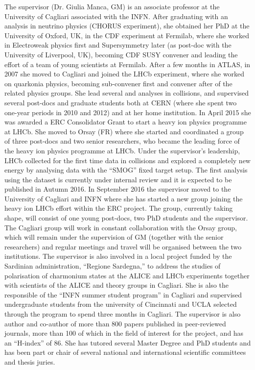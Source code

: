 \documentclass[a4paper,11pt]{article}
\begin{document}
The supervisor (Dr. Giulia Manca, GM) is an associate professor at the 
University of Cagliari associated with the INFN. After graduating with an 
analysis in neutrino physics (CHORUS experiment), she obtained her 
PhD at the University of Oxford, UK, in the CDF experiment at Fermilab,
where she worked in Electroweak physics first and Supersymmetry later
(as post-doc with the University of Liverpool, UK), becoming 
CDF SUSY convener and leading the effort of a team of young scientists
at Fermilab.
After a few months in ATLAS, in 2007 she moved to Cagliari and 
joined the LHCb experiment, where she worked on quarkonia physics, 
becoming sub-convener first and convener after of the related physics groups.
She lead several \Jpsi and \PgU analyses in \pp
collisions, and supervised several post-docs and graduate 
students both at CERN (where she spent two one-year periods
in 2010 and 2012) and at her home institution. In April 2015 she
was awarded a ERC Consolidator Grant to start a heavy ion physics 
programme at LHCb. She moved to Orsay (FR) 
where she started and coordinated a group of three post-docs and 
two senior researchers, who became the leading force of the 
heavy ion physics programme at LHCb. Under the supervisor's 
leadership, LHCb collected for the first time data in \PbPb 
collisions and explored a completely new energy by analysing
data with the ``SMOG'' fixed target setup.
The first analysis using the \PbPb dataset is currently under internal review
and it is expected to be published in Autumn 2016. 
In September 2016 the supervisor 
moved to the University of Cagliari and INFN where 
she has started a new group joining the heavy ion LHCb effort within 
the ERC project. The group, currently taking shape, will consist
of one young post-docs, two PhD students and the supervisor. The Cagliari group will work 
in constant collaboration with the Orsay group, which will remain 
under the supervision of GM (together with the senior researchers)
and regular meetings and travel will be organised between the two institutions.
The supervisor is also involved in a local project funded by the 
Sardinian administration, ``Regione Sardegna,'' to address the studies of 
polarisation of charmonium states at the ALICE and LHCb experiments
together with scientists of the ALICE and theory groups in Cagliari.
She is also the responsible of the ``INFN summer student program'' in 
Cagliari and supervised undergraduate students from the university of Cincinnati 
and UCLA selected through the program to spend three
months in Cagliari.
The supervisor is also author and co-author of more than 800 
papers published in peer-reviewed journals, more than 100 of which 
in the field of interest for the project, and has an ``H-index'' of 86.
She has tutored several Master Degree and PhD students and has
 been part or chair of several national
and international scientific committees and thesis juries.
\end{document}
